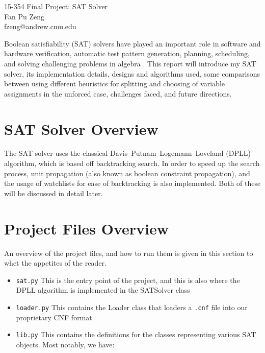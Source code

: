 \documentclass[11pt]{article}
\makeatletter
\newcommand{\myname}{Fan Pu Zeng}
\newcommand{\myandrew}{fzeng@andrew.cmu.edu}
\makeatother
\begin{document}
\medskip                        %

\thispagestyle{plain}
\begin{center}                  %
{\Large 15-354 Final Project: SAT Solver} \\
\myname \\
\myandrew \\
\end{center}

Boolean satisfiability (SAT) solvers have played an important role in software and hardware verification, automatic test pattern generation, planning, scheduling, and solving challenging problems in algebra \cite{handbook}. This report will introduce my SAT solver, its implementation details, designs and algorithms used, some comparisons between using different heuristics for splitting and choosing of variable assignments in the unforced case, challenges faced, and future directions.

\section{SAT Solver Overview}
The SAT solver uses the classical Davis–Putnam–Logemann–Loveland (DPLL) algorithm, which is based off backtracking search. In order to speed up the search process, unit propagation (also known as boolean constraint propagation), and the usage of watchlists for ease of backtracking is also implemented. Both of these will be discussed in detail later.

\section{Project Files Overview}
An overview of the project files, and how to run them is given in this section to whet the appetites of the reader.

\begin{itemize}
  \item \texttt{sat.py} This is the entry point of the project, and this is also where the DPLL algorithm is implemented  in the \textsf{SATSolver} class
  \item \texttt{loader.py} This contains the \textsf{Loader} class that loaders a \texttt{.cnf} file into our proprietary CNF format
  \item \texttt{lib.py} This contains the definitions for the classes representing various SAT objects. Most notably, we have:
\end{itemize}
\end{document}
